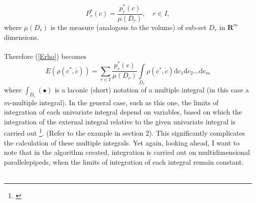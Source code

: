 \begin{equation}
P_{r}^{*}(c)=\frac{p_{r}^{*}(c)}{\mu(D_{r})}, \quad r \in I,
\end{equation}
where $\mu(D_{r})$ is the measure (analogous to the volume) of sub-set $D_{r}$ in $\boldsymbol{R}^{m}$ dimensions. \\
\\
Therefore (\ref{Erho}) becomes
\begin{equation}
E(\rho(c^{*},\dot{c}))=\sum\limits_{r \in I} \frac{p_{r}^{*}(c)}{\mu(D_{r})} \int\limits_{D_{r}}\rho(c^{*},\dot{c})\mathrm{d}c_{1}\mathrm{d}c_{2}\dots \mathrm{d}c_{m} \label{mathexpectancy}
\end{equation}
where $\int_ {D_{r}}(\bullet)$ is a laconic (short) notation of a multiple integral (in this case a $m$-multiple integral). In the general case, such as this one, the limits of integration of each univariate integral depend on variables, based on which the integration of the external integral relative to the given univariate integral is carried out \footnote{\cite{stewart_2008_int}}. (Refer to the example in section 2). This significantly complicates the calculation of these multiple integrals. Yet again, looking ahead, I want to note that in the algorithm created, integration is carried out on multidimensional parallelepipeds, when the limits of integration of each integral remain constant. \\
\\

